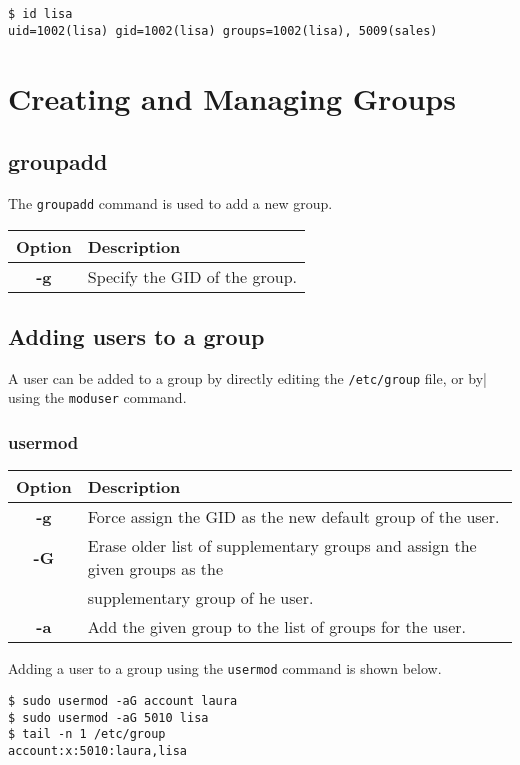 \begin{verbatim}
$ id lisa
uid=1002(lisa) gid=1002(lisa) groups=1002(lisa), 5009(sales)
\end{verbatim}

\section{Creating and Managing Groups}
\subsection{groupadd}
The \verb|groupadd| command is used to add a new group. 

\begin{tabular}{cl}
	\toprule
	\textbf{Option} &\textbf{Description} \\
	\midrule
	\textbf{-g} &Specify the GID of the group. \\
	\bottomrule
\end{tabular}

\subsection{Adding users to a group}
A user can be added to a group by directly editing the \verb|/etc/group| file, or by| using the \verb|moduser| command.

\subsubsection{usermod}
\begin{tabular}{cl}
	\toprule
	\textbf{Option} &\textbf{Description} \\
	\midrule
	\textbf{-g} &Force assign the GID as the new default group of the user.  \\
	\textbf{-G} &Erase older list of supplementary groups and assign the given groups as the \\&supplementary group of he user. \\
	\textbf{-a} &Add the given group to the list of groups for the user. \\
	\bottomrule
\end{tabular}

Adding a user to a group using the \verb|usermod| command is shown below. 

\begin{verbatim}
$ sudo usermod -aG account laura
$ sudo usermod -aG 5010 lisa
$ tail -n 1 /etc/group
account:x:5010:laura,lisa
\end{verbatim}

